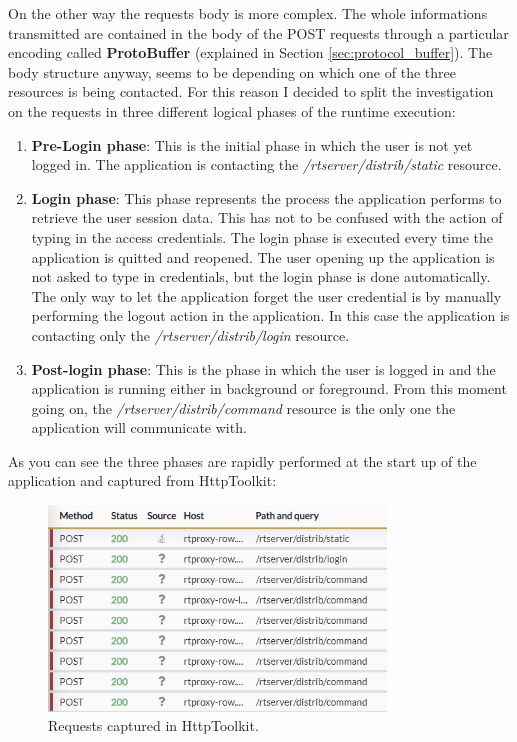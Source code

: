 		On the other way the requests body is more complex. The whole informations transmitted are contained in the body of the POST requests through a particular encoding called \textbf{ProtoBuffer} (explained in Section \ref{sec:protocol_buffer}). The body structure anyway, seems to be depending on which one of the three resources is being contacted. For this reason I decided to split the investigation on the requests in three different logical phases of the runtime execution:
		\begin{enumerate}
			\item \textbf{Pre-Login phase}: This is the initial phase in which the user is not yet logged in. The application is contacting the \textit{/rtserver/distrib/static} resource.\newline
			\item \textbf{Login phase}: This phase represents the process the application performs to retrieve the user session data. This has not to be confused with the action of typing in the access credentials. The login phase is executed every time the application is quitted and reopened. The user opening up the application is not asked to type in credentials, but the login phase is done automatically. The only way to let the application forget the user credential is by manually performing the logout action in the application. In this case the application is contacting only the \textit{/rtserver/distrib/login} resource.\newline
			\item \textbf{Post-login phase}: This is the phase in which the user is logged in and the application is running either in background or foreground. From this moment going on, the \textit{/rtserver/distrib/command} resource is the only one the application will communicate with.
		\end{enumerate}
		As you can see the three phases are rapidly performed at the start up of the application and captured from HttpToolkit:
		\begin{figure}[H]
				\centering
				\includegraphics[width=0.8\textwidth]{images/waze_phases.png}
				\caption{Requests captured in HttpToolkit.}
		\end{figure}
		
